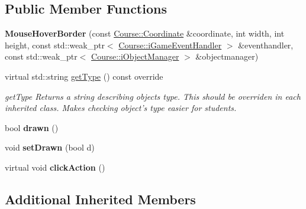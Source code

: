 \subsection*{Public Member Functions}
\begin{DoxyCompactItemize}
\item 
\hypertarget{class_student_1_1_mouse_hover_border_a9ea63fb0f0f329b6e6edd741725c1939}{{\bfseries Mouse\-Hover\-Border} (const \hyperlink{class_course_1_1_coordinate}{Course\-::\-Coordinate} \&coordinate, int width, int height, const std\-::weak\-\_\-ptr$<$ \hyperlink{class_course_1_1i_game_event_handler}{Course\-::i\-Game\-Event\-Handler} $>$ \&eventhandler, const std\-::weak\-\_\-ptr$<$ \hyperlink{class_course_1_1i_object_manager}{Course\-::i\-Object\-Manager} $>$ \&objectmanager)}\label{class_student_1_1_mouse_hover_border_a9ea63fb0f0f329b6e6edd741725c1939}

\item 
virtual std\-::string \hyperlink{class_student_1_1_mouse_hover_border_a7b49922f0ab5a473ec3dbcc253cad7fe}{get\-Type} () const override
\begin{DoxyCompactList}\small\item\em get\-Type Returns a string describing objects type. This should be overriden in each inherited class. Makes checking object's type easier for students. \end{DoxyCompactList}\item 
\hypertarget{class_student_1_1_mouse_hover_border_a1ce7f0b135a0e40f0673e9ced7076b37}{bool {\bfseries drawn} ()}\label{class_student_1_1_mouse_hover_border_a1ce7f0b135a0e40f0673e9ced7076b37}

\item 
\hypertarget{class_student_1_1_mouse_hover_border_afecbd9d1cffc95cc90c7c8af93ad4ef9}{void {\bfseries set\-Drawn} (bool d)}\label{class_student_1_1_mouse_hover_border_afecbd9d1cffc95cc90c7c8af93ad4ef9}

\item 
\hypertarget{class_student_1_1_mouse_hover_border_a125b8f6755447ac509de06cfd3071a77}{virtual void {\bfseries click\-Action} ()}\label{class_student_1_1_mouse_hover_border_a125b8f6755447ac509de06cfd3071a77}

\end{DoxyCompactItemize}
\subsection*{Additional Inherited Members}


